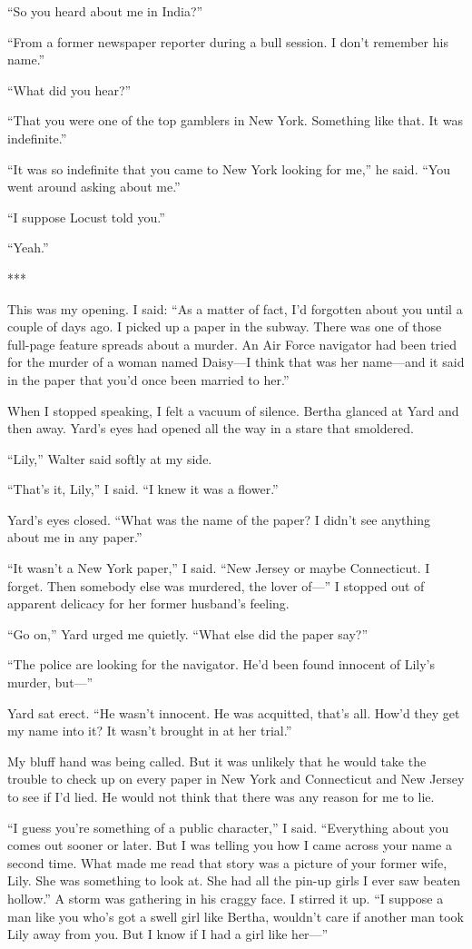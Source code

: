 \documentclass{novel}
\begin{document}
“So you heard about me in India?”

“From a former newspaper reporter during a bull session. I don’t remember his name.”

“What did you hear?”

“That you were one of the top gamblers in New York. Something like that. It was indefinite.”

“It was so indefinite that you came to New York looking for me,” he said. “You went around asking about me.”

“I suppose Locust told you.”

“Yeah.”

***

This was my opening. I said: “As a matter of fact, I’d forgotten about you until a couple of days ago. I picked up a paper in the subway. There was one of those full-page feature spreads about a murder. An Air Force navigator had been tried for the murder of a woman named Daisy—I think that was her name—and it said in the paper that you’d once been married to her.”

When I stopped speaking, I felt a vacuum of silence. Bertha glanced at Yard and then away. Yard’s eyes had opened all the way in a stare that smoldered.

“Lily,” Walter said softly at my side.

“That’s it, Lily,” I said. “I knew it was a flower.”

Yard’s eyes closed. “What was the name of the paper? I didn’t see anything about me in any paper.”

“It wasn’t a New York paper,” I said. “New Jersey or maybe Connecticut. I forget. Then somebody else was murdered, the lover of—” I stopped out of apparent delicacy for her former husband’s feeling.

“Go on,” Yard urged me quietly. “What else did the paper say?”

“The police are looking for the navigator. He’d been found innocent of Lily’s murder, but—”

Yard sat erect. “He wasn’t innocent. He was acquitted, that’s all. How’d they get my name into it? It wasn’t brought in at her trial.”

My bluff hand was being called. But it was unlikely that he would take the trouble to check up on every paper in New York and Connecticut and New Jersey to see if I’d lied. He would not think that there was any reason for me to lie.

“I guess you’re something of a public character,” I said. “Everything about you comes out sooner or later. But I was telling you how I came across your name a second time. What made me read that story was a picture of your former wife, Lily. She was something to look at. She had all the pin-up girls I ever saw beaten hollow.” A storm was gathering in his craggy face. I stirred it up. “I suppose a man like you who’s got a swell girl like Bertha, wouldn’t care if another man took Lily away from you. But I know if I had a girl like her—”
\end{document}
